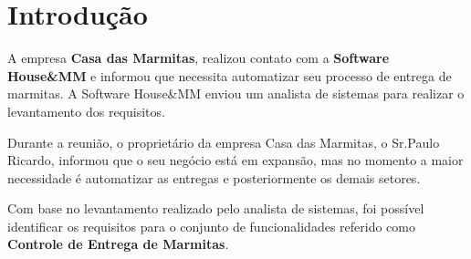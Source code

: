 \documentclass[
	12pt,				%
	openright,			%
	oneside,			%
	a4paper,			%
	english,			%
	french,				%
	spanish,			%
	brazil,				%
	]{abntex2}
\begin{document}
 
\frenchspacing
 
 
\imprimircapa
 
\tableofcontents*
\cleardoublepage
 
\textual
 
\chapter*[Introdução]{Introdução}

A empresa \textbf{Casa das Marmitas}, realizou contato com a \textbf{Software House\&MM} e informou que necessita automatizar seu processo de entrega de marmitas. A Software House\&MM enviou um analista de sistemas para realizar o levantamento dos requisitos.

Durante a reunião, o proprietário da empresa Casa das Marmitas, o Sr.Paulo Ricardo, informou que o seu negócio está em expansão, mas no momento a maior necessidade é automatizar as entregas e posteriormente os demais setores.

Com base no levantamento realizado pelo analista de sistemas, foi possível identificar os requisitos para o conjunto de funcionalidades referido como \textbf{Controle de Entrega de Marmitas}.
 





















 
\postextual
 
 
%
 
\end{document}
